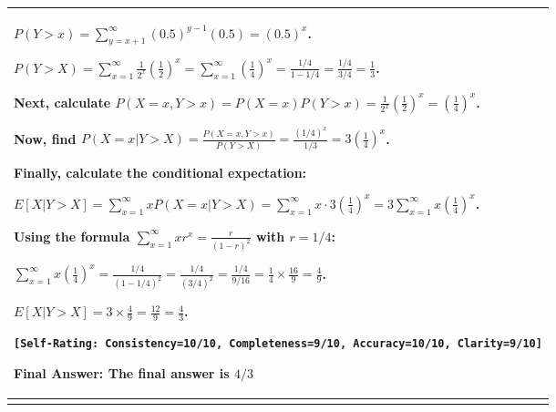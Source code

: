 \documentclass{article}
\theoremstyle{plain}
\theoremstyle{definition}
\theoremstyle{remark}
\begin{document}
\begin{longtable}{@{}p{\columnwidth}@{}}
{$P(Y > x) = \sum_{y=x+1}^\infty (0.5)^{y-1} (0.5) = (0.5)^x$.

$P(Y > X) = \sum_{x=1}^\infty \frac{1}{2^x} (\frac{1}{2})^x = \sum_{x=1}^\infty (\frac{1}{4})^x = \frac{1/4}{1 - 1/4} = \frac{1/4}{3/4} = \frac{1}{3}$.



Next, calculate $P(X=x, Y > x) = P(X=x) P(Y > x) = \frac{1}{2^x} (\frac{1}{2})^x = (\frac{1}{4})^x$.



Now, find $P(X=x | Y > X) = \frac{P(X=x, Y > x)}{P(Y > X)} = \frac{(1/4)^x}{1/3} = 3 (\frac{1}{4})^x$.



Finally, calculate the conditional expectation:

$E[X | Y > X] = \sum_{x=1}^\infty x P(X=x | Y > X) = \sum_{x=1}^\infty x \cdot 3 (\frac{1}{4})^x = 3 \sum_{x=1}^\infty x (\frac{1}{4})^x$.

Using the formula $\sum_{x=1}^\infty x r^x = \frac{r}{(1-r)^2}$ with $r = 1/4$:

$\sum_{x=1}^\infty x (\frac{1}{4})^x = \frac{1/4}{(1 - 1/4)^2} = \frac{1/4}{(3/4)^2} = \frac{1/4}{9/16} = \frac{1}{4} \times \frac{16}{9} = \frac{4}{9}$.



$E[X | Y > X] = 3 \times \frac{4}{9} = \frac{12}{9} = \frac{4}{3}$.

\texttt{\small [Self-Rating: Consistency=10/10, Completeness=9/10, Accuracy=10/10, Clarity=9/10]}

Final Answer: The final answer is $\boxed{4/3}$
}
\\
\bottomrule
\label{tab:teasers}
\end{longtable}

\newpage
\end{document}

